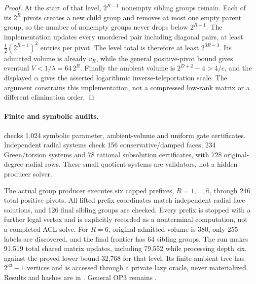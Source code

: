 \begin{proof}
At the start of that level, $2^{R-1}$ nonempty sibling groups remain.
Each of its $2^R$ pivots creates a new child group and removes at most one
empty parent group, so the number of nonempty groups never drops below
$2^{R-1}$. The implementation updates every unordered pair including
diagonal pairs, at least $\tfrac12(2^{R-1})^2$ entries per pivot. The
level total is therefore at least $2^{3R-3}$. Its admitted volume is
already $v_R$, while the general positive-pivot bound gives eventual
$V<1/\lambda=64\,2^R$. Finally the ambient volume is
$2^{D+2}-4>4/e$, and the displayed $\alpha$ gives the asserted logarithmic
inverse-teleportation scale. The argument constrains this implementation,
not a compressed low-rank matrix or a different elimination order.
\end{proof}

\paragraph{Finite and symbolic audits.}
 checks 1,024 symbolic parameter,
ambient-volume and uniform gate certificates. Independent radial systems
check 156 conservative/damped faces, 234 Green/torsion systems and 78
rational subsolution certificates, with 728 original-degree radial rows.
These small quotient systems are validators, not a hidden producer solver.

The actual group producer executes six capped prefixes, $R=1,\ldots,6$,
through 246 total positive pivots. All lifted prefix coordinates match
independent radial face solutions, and 126 final sibling groups are checked.
Every prefix is stopped with a further legal vertex and is explicitly
recorded as a nonterminal computation, not a completed ACL solve. For
$R=6$, original admitted volume is 380, only 255 labels are discovered,
and the final frontier has 64 sibling groups. The run makes 91,519 total
shared matrix updates, including 79,552 while processing depth six, against
the proved lower bound 32,768 for that level. Its finite ambient tree has
$2^{33}-1$ vertices and is accessed through a private lazy oracle, never
materialized. Results and hashes are in
. General OP3 remains
\statusopen.
